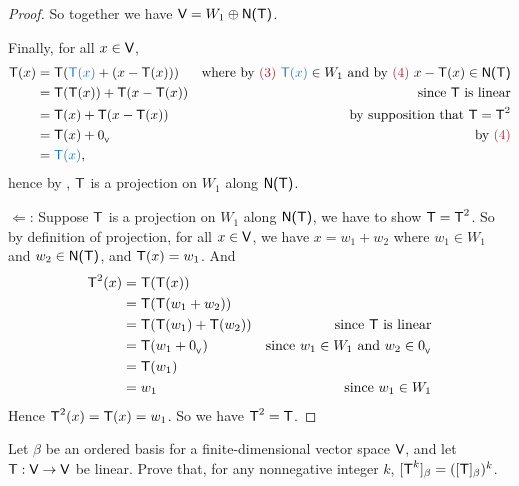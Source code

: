 \begin{proof}
So together we have \(\textsf{V} = W_1 \oplus \textsf{N(T)}\).

Finally, for all \(x \in \textsf{V}\),
\begin{align*}
    \T(x) & = \T(\BLUE{\T(x)} + (x - \T(x))) & \text{where by \MAROON{(3)} \(\BLUE{\T(x)} \in W_1\) and by \MAROON{(4)} \(x - \T(x) \in \NULLT\)} \\
          & = \T(\T(x)) + \T(x - \T(x)) & \text{since \(\T\) is linear} \\
          & = \T(x) + \T(x - \T(x)) & \text{by supposition that \(\T = \T^2\)} \\
          & = \T(x) + \OV & \text{by \MAROON{(4)}} \\
          & = \BLUE{\T(x)},
\end{align*}
hence by , \(\textsf{T}\) is a projection on \(W_1\) along \(\textsf{N(T)}\).

\(\Longleftarrow\): Suppose \(\textsf{T}\) is a projection on \(W_1\) along \(\textsf{N(T)}\), we have to show \(\textsf{T} = \textsf{T}^2\).
So by definition of projection, for all \(x \in \textsf{V}\), we have \(x = w_1 + w_2\) where \(w_1 \in W_1\) and \(w_2 \in \textsf{N(T)}\), and \(\textsf{T}(x) = w_1\).
And
\begin{align*}
    \textsf{T}^2(x) & = \textsf{T}(\textsf{T}(x)) \\
            & = \textsf{T}(\textsf{T}(w_1 + w_2)) \\
            & = \textsf{T}(\textsf{T}(w_1) + \textsf{T}(w_2)) & \text{since \(\textsf{T}\) is linear} \\
            & = \textsf{T}(w_1 + 0_{_{\textsf{V}}}) & \text{since \(w_1 \in W_1\) and \(w_2 \in 0_{_{\textsf{V}}}\)} \\
            & = \textsf{T}(w_1) \\
            & = w_1 & \text{since \(w_1 \in W_1\)}
\end{align*}
Hence \(\textsf{T}^2(x) = \textsf{T}(x) = w_1\).
So we have \(\textsf{T}^2 = \textsf{T}\).
\end{proof}

\begin{exercise} \label{exercise 2.3.18}
Let \(\beta\) be an ordered basis for a finite-dimensional vector space \(\textsf{V}\), and let \(\textsf{T} : \textsf{V} \to \textsf{V}\) be linear.
Prove that, for any nonnegative integer \(k\),
\([\textsf{T}^k]_{\beta} = ([\textsf{T}]_{\beta})^k\).
\end{exercise}


